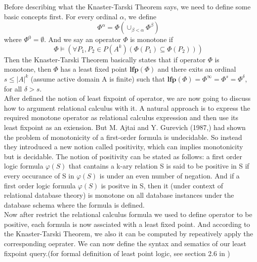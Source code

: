 Before describing what the Knaster-Tarski Theorem says, we need to define some basic concepts first. For every ordinal $\alpha$, we define 
$$\Phi^{\alpha}=\Phi(\cup_{\beta<\alpha} \Phi^{\beta})$$
where $\Phi^0=\emptyset$. And we say an operator $\Phi$ is monotone if 
$$\Phi\models(\forall P_1,P_2\in P(A^k)(\Phi(P_1)\subseteq\Phi(P_2)))$$
Then the Knaster-Tarski Theorem basically states that if operator $\Phi$ is monotone, then $\Phi$ has a least fixed point $\textbf{lfp}(\Phi)$ and there exits an ordinal $s\leq |A|^k$ (assume active domain A is finite) such that $\textbf{lfp}(\Phi)=\Phi^{\infty}=\Phi^s=\Phi^{\delta}$, for all $\delta > s$.\\
After defined the notion of least fixpoint of operator, we are now going to discuss how to argument relational calculus with it. A natural approach is to express the required monotone operator as relational calculus expression and then use its least fixpoint as an exiension. But M. Ajtai and Y. Gurevich (1987,\cite{Ajtai}) had shown the problem of monotonicity of a first-order formula is undecidable. So instead they introduced a new notion called positivity, which can implies monotonicity but is decidable. The notion of positivity can be stated as follows: a first order logic formula $\varphi(S)$ that cantains a k-ary relation S is said to be positive in S if every occurance of S in $\varphi(S)$ is under an even number of negation. And if a first order logic formula $\varphi(S)$ is positve in S, then it (under context of relational database theory) is monotone on all database instances under the database schema where the formula is defined.\\ 
Now after restrict the relational calculus formula we used to define operator to be positive, each formula is now assciated with a least fixed point. And according to the Knaster-Tarski Theorem, we also it can be computed by repeatively apply the corresponding oeprater. We can now define the syntax and sematics of our least fixpoint query.(for formal definition of least point logic, see section 2.6 in \cite{kolaitis1})\\

